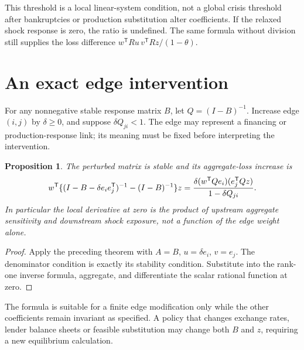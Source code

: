 \documentclass[11pt]{article}
\newtheorem{proposition}[theorem]{Proposition}
\theoremstyle{definition}
\begin{document}
This threshold is a local linear-system condition, not a global crisis
threshold after bankruptcies or production substitution alter coefficients.
If the relaxed shock response is zero, the ratio is undefined. The same
formula without division still supplies the loss difference
$w^{\mathsf T}Ru\,v^{\mathsf T}Rz/(1-\theta)$.

\section*{An exact edge intervention}
For any nonnegative stable response matrix $B$, let $Q=(I-B)^{-1}$.
Increase edge $(i,j)$ by $\delta\ge0$, and suppose
$\delta Q_{ji}<1$. The edge may represent a financing or production-response
link; its meaning must be fixed before interpreting the intervention.
\begin{proposition}
The perturbed matrix is stable and its aggregate-loss increase is
\[
 w^{\mathsf T}\{(I-B-\delta e_ie_j^{\mathsf T})^{-1}-(I-B)^{-1}\}z
 ={\delta(w^{\mathsf T}Qe_i)(e_j^{\mathsf T}Qz)\over1-\delta Q_{ji}}.
\]
In particular the local derivative at zero is the product of upstream
aggregate sensitivity and downstream shock exposure, not a function of
the edge weight alone.
\end{proposition}
\begin{proof}
Apply the preceding theorem with $A=B$, $u=\delta e_i$, $v=e_j$.
The denominator condition is exactly its stability condition. Substitute
into the rank-one inverse formula, aggregate, and differentiate the scalar
rational function at zero.
\end{proof}

The formula is suitable for a finite edge modification only while the other
coefficients remain invariant as specified. A policy that changes exchange
rates, lender balance sheets or feasible substitution may change both $B$
and $z$, requiring a new equilibrium calculation.
\end{document}
